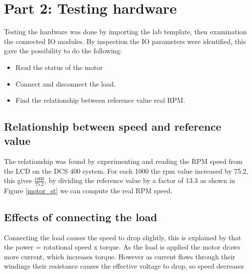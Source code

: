 \section{Part 2: Testing hardware}

Testing the hardware was done by importing the lab template, then examination the connected IO modules. By inspection the IO parameters were identified, this gave the possibility to do the following:

 \begin{itemize}
    \item {Read the status of the motor}
     \item {Connect and disconnect the load.}
    \item {Find the relationship between reference value real RPM.}
   
 \end{itemize}


\subsection{Relationship between speed and reference value}

The relationship was found by experimenting and reading the RPM speed from the LCD on the DCS 400 system. For each 1000 the rpm value increased by 75.2, this gives \( \frac{1000}{75.2} \), by dividing the reference value by a factor of 13.3 as shown in Figure \ref{motor_st} we can compute the real RPM speed.

\hfill \break
\subsection{Effects of connecting the load}
Connecting the load causes the speed to drop slightly, this is explained by that the power = rotational speed x torque. As the load is applied the motor draws more current, which increases torque. However as current flows through their windings their resistance causes the effective voltage to drop, so speed decreases


